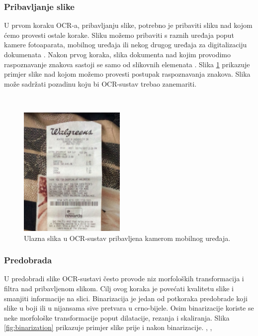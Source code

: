\documentclass[times, utf8, zavrsni]{fer}
\begin{document}
\subsubsection{Pribavljanje slike}
U prvom koraku OCR-a, pribavljanju slike, potrebno je pribaviti sliku nad kojom
ćemo provesti ostale korake. Sliku možemo pribaviti s raznih uređaja poput
kamere fotoaparata, mobilnog uređaja ili nekog drugog uređaja za digitalizaciju
dokumenata . Nakon prvog koraka, slika dokumenta nad kojim
provodimo raspoznavanje znakova sastoji se samo od slikovnih elemenata
 \citep{Vynckier:2018:HowOcrWorks}. Slika
\ref{fig:receipt-example-02} prikazuje primjer slike nad kojom možemo provesti
postupak raspoznavanja znakova. Slika može sadržati pozadinu koju
bi OCR-sustav trebao zanemariti.

\

\begin{figure}[htb]
    \centering
    \includegraphics[height=6.3cm]{images/receipt-example-02.jpeg}
    \caption{Ulazna slika u OCR-sustav pribavljena kamerom mobilnog uređaja.}
    \label{fig:receipt-example-02}
\end{figure}


\subsubsection{Predobrada}
U predobradi slike OCR-sustavi često provode niz morfoloških transformacija i
filtra nad pribavljenom slikom. Cilj ovog koraka je povećati kvalitetu slike i
smanjiti informacije na slici. Binarizacija je jedan od potkoraka predobrade
koji slike u boji ili u nijansama sive pretvara u crno-bijele. Osim binarizacije
koriste se neke morfološke transformacije poput dilatacije, rezanja i
skaliranja. Slika \ref{fig:binarization} prikazuje primjer slike prije i nakon
binarizacije. \citep{Gulan:2016:Bacherlor},
\citep{DBLP:journals/corr/abs-1710-05703}, \citep{Jurin:2017:Master}
\end{document}

